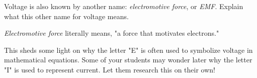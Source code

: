 

Voltage is also known by another name: {\it electromotive force}, or {\it EMF}.  Explain what this other name for voltage means.







{\it Electromotive force} literally means, "a force that motivates electrons."







This sheds some light on why the letter "E" is often used to symbolize voltage in mathematical equations.  Some of your students may wonder later why the letter "I" is used to represent current.  Let them research this on their own!




